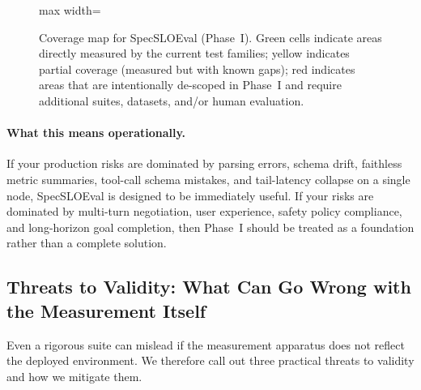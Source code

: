 \documentclass[11pt]{article}
\begin{document}
\begin{figure}[t]
\begin{adjustbox}{max width=\linewidth}
\end{adjustbox}
    \caption{Coverage map for SpecSLOEval (Phase~I). Green cells indicate areas directly measured by the current test families; yellow indicates partial coverage (measured but with known gaps); red indicates areas that are intentionally de-scoped in Phase~I and require additional suites, datasets, and/or human evaluation.}
    \label{fig:coverage-map}
\end{figure}

\paragraph{What this means operationally.}
If your production risks are dominated by parsing errors, schema drift, faithless metric summaries, tool-call schema mistakes, and tail-latency collapse on a single node, SpecSLOEval is designed to be immediately useful.
If your risks are dominated by multi-turn negotiation, user experience, safety policy compliance, and long-horizon goal completion, then Phase~I should be treated as a foundation rather than a complete solution.

\subsection{Threats to Validity: What Can Go Wrong with the Measurement Itself}

Even a rigorous suite can mislead if the measurement apparatus does not reflect the deployed environment.
We therefore call out three practical threats to validity and how we mitigate them.
\end{document}
